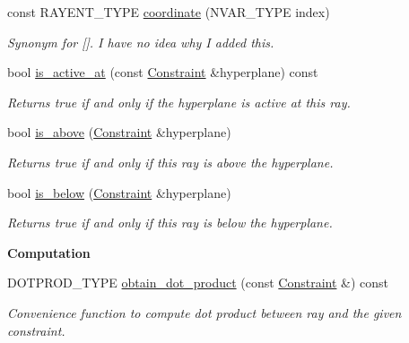 \begin{Indent}
\begin{DoxyCompactItemize}
const R\+A\+Y\+E\+N\+T\+\_\+\+T\+Y\+PE \hyperlink{group___c_l_s_solvers_a66e4d7533edb52e344eb68c7e723a65c}{coordinate} (N\+V\+A\+R\+\_\+\+T\+Y\+PE index)
\begin{DoxyCompactList}\small\item\em Synonym for \mbox{[}\mbox{]}. I have no idea why I added this. \end{DoxyCompactList}\item 
bool \hyperlink{group___c_l_s_solvers_a935fd2cf258315c989cd4edce32371e7}{is\+\_\+active\+\_\+at} (const \hyperlink{group___c_l_s_solvers_class_l_p___solvers_1_1_constraint}{Constraint} \&hyperplane) const
\begin{DoxyCompactList}\small\item\em Returns {\ttfamily true} if and only if the hyperplane is active at this ray. \end{DoxyCompactList}\item 
bool \hyperlink{group___c_l_s_solvers_aec0fb992267a74f098fef5ca6c159cad}{is\+\_\+above} (\hyperlink{group___c_l_s_solvers_class_l_p___solvers_1_1_constraint}{Constraint} \&hyperplane)
\begin{DoxyCompactList}\small\item\em Returns {\ttfamily true} if and only if this ray is above the hyperplane. \end{DoxyCompactList}\item 
bool \hyperlink{group___c_l_s_solvers_a4bdad8c5669c06827f3984583e764353}{is\+\_\+below} (\hyperlink{group___c_l_s_solvers_class_l_p___solvers_1_1_constraint}{Constraint} \&hyperplane)
\begin{DoxyCompactList}\small\item\em Returns {\ttfamily true} if and only if this ray is below the hyperplane. \end{DoxyCompactList}\end{DoxyCompactItemize}
\end{Indent}
\begin{Indent}\textbf{ Computation}\par
\begin{DoxyCompactItemize}
\item 
D\+O\+T\+P\+R\+O\+D\+\_\+\+T\+Y\+PE \hyperlink{group___c_l_s_solvers_a431363fc157d5a8df8b180ac671e19ea}{obtain\+\_\+dot\+\_\+product} (const \hyperlink{group___c_l_s_solvers_class_l_p___solvers_1_1_constraint}{Constraint} \&) const
\begin{DoxyCompactList}\small\item\em Convenience function to compute dot product between ray and the given constraint. \end{DoxyCompactList}\end{DoxyCompactItemize}
\end{Indent}
